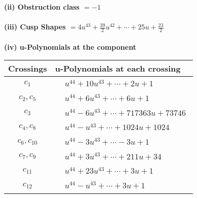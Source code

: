 \documentclass[1p]{elsarticle_modified}
\theoremstyle{definition}
\begin{document}
\flushleft \textbf{(ii) Obstruction class $= -1$}\\~\\
\flushleft \textbf{(iii) Cusp Shapes $= 4 u^{43}+\frac{39}{2} u^{42}+\cdots+25 u+\frac{23}{2}$}\\~\\
\newpage\renewcommand{\arraystretch}{1}
\flushleft \textbf{(iv) u-Polynomials at the component}\newline \\
\begin{tabular}{m{50pt}|m{274pt}}
Crossings & \hspace{64pt}u-Polynomials at each crossing \\
\hline $$\begin{aligned}c_{1}\end{aligned}$$&$\begin{aligned}
&u^{44}+10 u^{43}+\cdots+2 u+1
\end{aligned}$\\
\hline $$\begin{aligned}c_{2},c_{5}\end{aligned}$$&$\begin{aligned}
&u^{44}+6 u^{43}+\cdots+6 u+1
\end{aligned}$\\
\hline $$\begin{aligned}c_{3}\end{aligned}$$&$\begin{aligned}
&u^{44}-6 u^{43}+\cdots+717363 u+73746
\end{aligned}$\\
\hline $$\begin{aligned}c_{4},c_{8}\end{aligned}$$&$\begin{aligned}
&u^{44}- u^{43}+\cdots+1024 u+1024
\end{aligned}$\\
\hline $$\begin{aligned}c_{6},c_{10}\end{aligned}$$&$\begin{aligned}
&u^{44}-3 u^{43}+\cdots-3 u+1
\end{aligned}$\\
\hline $$\begin{aligned}c_{7},c_{9}\end{aligned}$$&$\begin{aligned}
&u^{44}+3 u^{43}+\cdots+211 u+34
\end{aligned}$\\
\hline $$\begin{aligned}c_{11}\end{aligned}$$&$\begin{aligned}
&u^{44}+23 u^{43}+\cdots+3 u+1
\end{aligned}$\\
\hline $$\begin{aligned}c_{12}\end{aligned}$$&$\begin{aligned}
&u^{44}- u^{43}+\cdots+3 u+1
\end{aligned}$\\
\hline
\end{tabular}\\~\\
\end{document}
